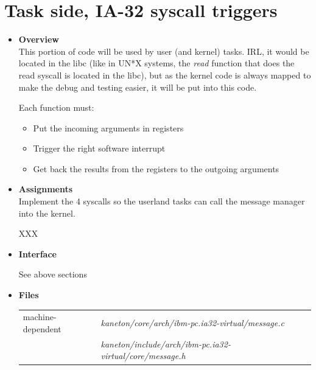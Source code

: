 \section{Task side, \textbf{IA-32 syscall triggers}}
\begin{itemize}
  \item {\bf Overview}\\

    This portion of code will be used by user (and kernel) tasks. IRL,
    it would be located in the libc (like in UN*X systems, the
    \emph{read} function that does the read syscall is located in the
    libc), but as the kernel code is always mapped to make the debug
    and testing easier, it will be put into this code.

    Each function must:

    \begin{itemize}
      \item
	Put the incoming arguments in registers
      \item
	Trigger the right software interrupt
      \item
	Get back the results from the registers to the outgoing arguments
    \end{itemize}

  \item {\bf Assignments}\\

    Implement the 4 syscalls so the userland tasks can call the
    message manager into the kernel.

    XXX

  \item {\bf Interface}\\

	 {}

	 {}

	 {}

	 {See above sections}

  \item {\bf {Files}}\\

    \begin{tabular}{| l | l |}
      \hline
      machine-dependent & {\em kaneton/core/arch/ibm-pc.ia32-virtual/message.c}\\
      & {\em kaneton/include/arch/ibm-pc.ia32-virtual/core/message.h}\\\hline
    \end{tabular}

\end{itemize}

